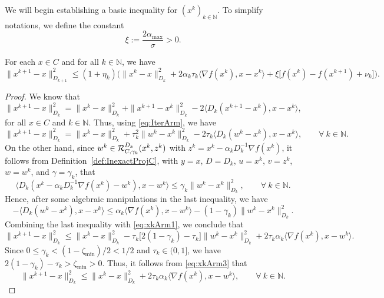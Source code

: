 We will begin establishing  a basic inequality for    $(x^k)_{k\in\mathbb{N}}$.  To simplify  notations, we define the constant
\begin{equation} \label{eq:eta}
	\xi := \dfrac{2 \alpha_{\max}}{\sigma} > 0.
\end{equation}	
\begin{lemma}\label{Le:xkArm}
	For each  $x\in C$ and for all $k \in \mathbb{N}$, we have
	\begin{equation}\label{eq:xkArm}
	\|x^{k+1}-x\|_{D_{k+1}}^2 \leq (1+\eta_k)\Big(\|x^k-x\|_{D_k}^2 + 2\alpha_k\tau_k \big\langle \nabla f(x^k), x-x^k\big\rangle + \xi \big[f(x^k) - f(x^{k+1})+ \nu_k \big]\Big).
	\end{equation}		
\end{lemma}
\begin{proof}
	We know that $\|x^{k+1}-x\|_{D_k}^2 = \|x^k-x\|_{D_k}^2 + \|x^{k+1}-x^k\|_{D_k}^2 - 2 \langle {D_k} ( x^{k+1}-x^k), x-x^k \rangle$, for all $x \in C$ and $k \in \mathbb{N}$. Thus, using \eqref{eq:IterArm}, we have
	\begin{equation}\label{eq:xkArm1}
		\|x^{k+1}-x\|_{D_k}^2 = \|x^k-x\|_{D_k}^2 + \tau_k^2\|w^k - x^{k}\|_{D_k}^2 - 2 \tau_k \big\langle {D_k}(w^k - x^{k}), x-x^k \big\rangle, \qquad \forall ~k \in \mathbb{N}.
	\end{equation}
	On the other hand, since  $w^k \in{\cal R}_{C,\gamma_k}^{D_k}(x^{k}, z^k)$ with $z^k = x^{k}-\alpha_k D_k^{-1} \nabla f(x^{k})$, it follows from Definition~\ref{def:InexactProjC},  with $y=x$, $D = D_k$, $u = x^k$, $v = z^k$, $w = w^k$,  and $\gamma = \gamma_k$,  that
	$$
		\big\langle D_k(x^k-\alpha_kD_k^{-1}\nabla f(x^k)-w^k), x-w^k\big\rangle \leq \gamma_k \|w^k - x^{k}\|_{D_k}^2, \qquad \forall ~k \in \mathbb{N}.
	$$
	Hence,  after some algebraic manipulations in the last inequality, we have
	$$
		-\big\langle D_k(w^k-x^k), x-x^k\big\rangle \leq \alpha_k \big\langle \nabla f(x^k), x-w^k \big\rangle - (1-\gamma_k) \|w^k-x^k\|_{D_k}^2.
	$$
	Combining the last inequality with \eqref{eq:xkArm1},  we conclude  that
	\begin{equation} \label{eq:xkArm3}
		\|x^{k+1}-x\|_{D_k}^2 \leq \|x^k-x\|_{D_k}^2 - \tau_k \big[2(1-\gamma_k) - \tau_k \big] \|w^k-x^k\|_{D_k}^2 + 2\tau_k\alpha_k \big\langle \nabla f(x^k), x-w^k\big\rangle.
	\end{equation}
	Since $0 \leq \gamma_k <(1-{\zeta_{\min}})/2 < 1/2$ and $\tau_k \in (0, 1]$, we have $2(1-\gamma_k) - \tau_k > {\zeta_{\min}} > 0$. Thus, it follows from \eqref{eq:xkArm3} that
	$$
		\|x^{k+1}-x\|_{D_k}^2 \leq \|x^k-x\|_{D_k}^2 + 2\tau_k\alpha_k \big\langle \nabla f(x^k), x-w^k\big\rangle, \qquad \forall ~k \in \mathbb{N}.
$$
\end{proof}

